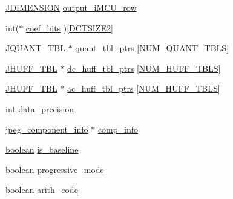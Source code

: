 \begin{DoxyCompactItemize}
\item 
\mbox{\hyperlink{jmorecfg_8h_a04ed4674f6f1d0d50ec241531e38274f}{J\+D\+I\+M\+E\+N\+S\+I\+ON}} \mbox{\hyperlink{structjpeg__decompress__struct_a8bc74336c804741b32fea874f8410c88}{output\+\_\+i\+M\+C\+U\+\_\+row}}
\item 
int($\ast$ \mbox{\hyperlink{structjpeg__decompress__struct_a61c024a1b3f2bc0b32ff7c3145ac7f2c}{coef\+\_\+bits}} )\mbox{[}\mbox{\hyperlink{jpeglib_8h_af89dff4200396563157d4a1e59da3bdf}{D\+C\+T\+S\+I\+Z\+E2}}\mbox{]}
\item 
\mbox{\hyperlink{structJQUANT__TBL}{J\+Q\+U\+A\+N\+T\+\_\+\+T\+BL}} $\ast$ \mbox{\hyperlink{structjpeg__decompress__struct_a42be2e7197a38cf83e6cebbaac006ca6}{quant\+\_\+tbl\+\_\+ptrs}} \mbox{[}\mbox{\hyperlink{jpeglib_8h_ab3254a23612ea48615001fffc0c9f691}{N\+U\+M\+\_\+\+Q\+U\+A\+N\+T\+\_\+\+T\+B\+LS}}\mbox{]}
\item 
\mbox{\hyperlink{structJHUFF__TBL}{J\+H\+U\+F\+F\+\_\+\+T\+BL}} $\ast$ \mbox{\hyperlink{structjpeg__decompress__struct_a805ecdbfbc59d66a6879de06dc4c35e0}{dc\+\_\+huff\+\_\+tbl\+\_\+ptrs}} \mbox{[}\mbox{\hyperlink{jpeglib_8h_a6b12985705944e0623b671f29dc5722e}{N\+U\+M\+\_\+\+H\+U\+F\+F\+\_\+\+T\+B\+LS}}\mbox{]}
\item 
\mbox{\hyperlink{structJHUFF__TBL}{J\+H\+U\+F\+F\+\_\+\+T\+BL}} $\ast$ \mbox{\hyperlink{structjpeg__decompress__struct_a8d6e49569f3edc0ad43ffa5d6a95bb48}{ac\+\_\+huff\+\_\+tbl\+\_\+ptrs}} \mbox{[}\mbox{\hyperlink{jpeglib_8h_a6b12985705944e0623b671f29dc5722e}{N\+U\+M\+\_\+\+H\+U\+F\+F\+\_\+\+T\+B\+LS}}\mbox{]}
\item 
int \mbox{\hyperlink{structjpeg__decompress__struct_ad55d8fc56faa42d05d1a80ad84ce3e9c}{data\+\_\+precision}}
\item 
\mbox{\hyperlink{structjpeg__component__info}{jpeg\+\_\+component\+\_\+info}} $\ast$ \mbox{\hyperlink{structjpeg__decompress__struct_afb7ab593b5699842965eccb64e6e200a}{comp\+\_\+info}}
\item 
\mbox{\hyperlink{jmorecfg_8h_a7c6368b321bd9acd0149b030bb8275ed}{boolean}} \mbox{\hyperlink{structjpeg__decompress__struct_a7ba5fd9c43f0bd3161f1fc618aa39e37}{is\+\_\+baseline}}
\item 
\mbox{\hyperlink{jmorecfg_8h_a7c6368b321bd9acd0149b030bb8275ed}{boolean}} \mbox{\hyperlink{structjpeg__decompress__struct_a6e2f9fd1cba287dc632070f3c8390d1c}{progressive\+\_\+mode}}
\item 
\mbox{\hyperlink{jmorecfg_8h_a7c6368b321bd9acd0149b030bb8275ed}{boolean}} \mbox{\hyperlink{structjpeg__decompress__struct_aa59d02c7dfa58e22321c1f5fa154b151}{arith\+\_\+code}}

\end{DoxyCompactItemize}
